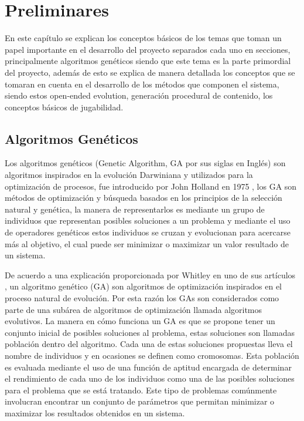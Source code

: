 \chapter{Preliminares}
\label{chapter:preliminaries}

En este capítulo se explican los conceptos básicos de los temas que toman un
papel importante en el desarrollo del proyecto separados cada uno en secciones,
principalmente algoritmos genéticos siendo que este tema es la parte primordial
del proyecto, además de esto se explica de manera detallada los conceptos que se
tomaran en cuenta en el desarrollo de los métodos que componen el sistema,
siendo estos open-ended evolution, generación procedural de contenido, los
conceptos básicos de jugabilidad.

\section{Algoritmos Genéticos}
\label{section:genetic-algorithms}

Los algoritmos genéticos (Genetic Algorithm, GA por sus siglas en Inglés) son
algoritmos inspirados en la evolución Darwiniana y utilizados para la
optimización de procesos, fue introducido por John Holland en 1975
\cite{Holland1975}, los GA son métodos de optimización y búsqueda basados en los
principios de la selección natural y genética, la manera de representarlos es
mediante un grupo de individuos que representan posibles soluciones a un
problema y mediante el uso de operadores genéticos estos individuos se cruzan y
evolucionan para acercarse más al objetivo, el cual puede ser minimizar o
maximizar un valor resultado de un sistema.

De acuerdo a una explicación proporcionada por Whitley en uno de sus artículos
\cite{Whitley1994}, un algoritmo genético (GA) son algoritmos de optimización
inspirados en el proceso natural de evolución. Por esta razón los GAs son
considerados como parte de una subárea de algoritmos de optimización llamada
algoritmos evolutivos. La manera en cómo funciona un GA es que se propone tener
un conjunto inicial de posibles soluciones al problema, estas soluciones son
llamadas población dentro del algoritmo. Cada una de estas soluciones propuestas
lleva el nombre de individuos y en ocasiones se definen como cromosomas. Esta
población es evaluada mediante el uso de una función de aptitud encargada de
determinar el rendimiento de cada uno de los individuos como una de las posibles
soluciones para el problema que se está tratando. Este tipo de problemas
comúnmente involucran encontrar un conjunto de parámetros que permitan minimizar
o maximizar los resultados obtenidos en un sistema.

